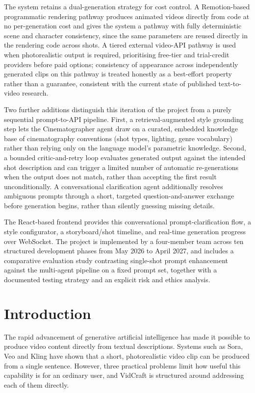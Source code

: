\documentclass[11pt,a4paper]{article}
\begin{document}
The system retains a dual-generation strategy for cost control. A Remotion-based programmatic rendering pathway produces animated videos directly from code at no per-generation cost and gives the system a pathway with fully deterministic scene and character consistency, since the same parameters are reused directly in the rendering code across shots. A tiered external video-API pathway is used when photorealistic output is required, prioritising free-tier and trial-credit providers before paid options; consistency of appearance across independently generated clips on this pathway is treated honestly as a best-effort property rather than a guarantee, consistent with the current state of published text-to-video research.

Two further additions distinguish this iteration of the project from a purely sequential prompt-to-API pipeline. First, a retrieval-augmented style grounding step lets the Cinematographer agent draw on a curated, embedded knowledge base of cinematography conventions (shot types, lighting, genre vocabulary) rather than relying only on the language model's parametric knowledge. Second, a bounded critic-and-retry loop evaluates generated output against the intended shot description and can trigger a limited number of automatic re-generations when the output does not match, rather than accepting the first result unconditionally. A conversational clarification agent additionally resolves ambiguous prompts through a short, targeted question-and-answer exchange before generation begins, rather than silently guessing missing details.

The React-based frontend provides this conversational prompt-clarification flow, a style configurator, a storyboard/shot timeline, and real-time generation progress over WebSocket. The project is implemented by a four-member team across ten structured development phases from May 2026 to April 2027, and includes a comparative evaluation study contrasting single-shot prompt enhancement against the multi-agent pipeline on a fixed prompt set, together with a documented testing strategy and an explicit risk and ethics analysis.

\needspace{0.5\textheight}
\section{Introduction}

The rapid advancement of generative artificial intelligence has made it possible to produce video content directly from textual descriptions. Systems such as Sora, Veo and Kling have shown that a short, photorealistic video clip can be produced from a single sentence. However, three practical problems limit how useful this capability is for an ordinary user, and VidCraft is structured around addressing each of them directly.
\end{document}
